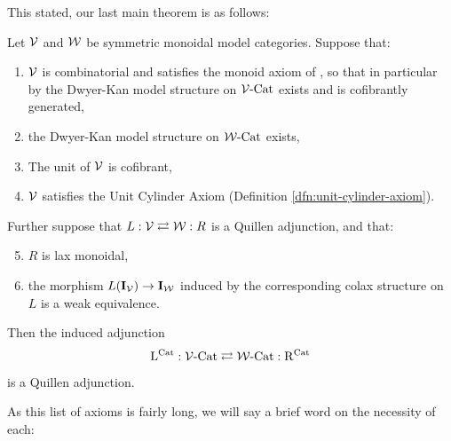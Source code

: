 \documentclass[12pt]{amsart}
\begin{document}
This stated, our last main theorem is as follows:
\begin{theorem}\label{thm:main-theorem-chapter-two}
	Let $\mathcal{V}$ and $\mathcal{W}$ be symmetric monoidal model categories. Suppose that:
	\begin{enumerate}
		\item $\mathcal{V}$ is combinatorial and satisfies the monoid axiom of \cite{SchwedeShipley1998}, so that in particular by \cite[Theorem 1.1]{Muro2012} the Dwyer-Kan model structure on $\mathcal{V}\text{-}\mathrm{Cat}$ exists and is cofibrantly generated,
		\item the Dwyer-Kan model structure on $\mathcal{W}\text{-}\mathrm{Cat}$ exists,
		\item The unit of $\mathcal{V}$ is cofibrant,
		\item $\mathcal{V}$ satisfies the Unit Cylinder Axiom (Definition \ref{dfn:unit-cylinder-axiom}).
	\end{enumerate}
	Further suppose that $L : \mathcal{V} \rightleftarrows \mathcal{W} : R$ is a Quillen adjunction, and that:
	\begin{enumerate}
	\setcounter{enumi}{4}
		\item $R$ is lax monoidal,
		\item the morphism $L(\mathbf{I}_\mathcal{V}) \to \mathbf{I}_\mathcal{W}$ induced by the corresponding colax structure on $L$ is a weak equivalence.
	\end{enumerate}
	Then the induced adjunction 
	$$\mathrm{L}^{\mathrm{Cat}} : \mathcal{V}\text{-}\mathrm{Cat} \rightleftarrows \mathcal{W}\text{-}\mathrm{Cat} : \mathrm{R}^{\mathrm{Cat}}$$
	is a Quillen adjunction.
\end{theorem}
As this list of axioms is fairly long, we will say a brief word on the necessity of each: 
\end{document}

